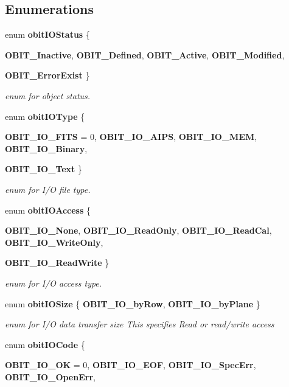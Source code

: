 \subsection*{Enumerations}
\begin{CompactItemize}
\item 
enum {\bf obit\-IOStatus} \{ \par
{\bf OBIT\_\-Inactive}, 
{\bf OBIT\_\-Defined}, 
{\bf OBIT\_\-Active}, 
{\bf OBIT\_\-Modified}, 
\par
{\bf OBIT\_\-Error\-Exist}
 \}
\begin{CompactList}\small\item\em enum for object status. \item\end{CompactList}\item 
enum {\bf obit\-IOType} \{ \par
{\bf OBIT\_\-IO\_\-FITS} = 0, 
{\bf OBIT\_\-IO\_\-AIPS}, 
{\bf OBIT\_\-IO\_\-MEM}, 
{\bf OBIT\_\-IO\_\-Binary}, 
\par
{\bf OBIT\_\-IO\_\-Text}
 \}
\begin{CompactList}\small\item\em enum for I/O file type. \item\end{CompactList}\item 
enum {\bf obit\-IOAccess} \{ \par
{\bf OBIT\_\-IO\_\-None}, 
{\bf OBIT\_\-IO\_\-Read\-Only}, 
{\bf OBIT\_\-IO\_\-Read\-Cal}, 
{\bf OBIT\_\-IO\_\-Write\-Only}, 
\par
{\bf OBIT\_\-IO\_\-Read\-Write}
 \}
\begin{CompactList}\small\item\em enum for I/O access type. \item\end{CompactList}\item 
enum {\bf obit\-IOSize} \{ {\bf OBIT\_\-IO\_\-by\-Row}, 
{\bf OBIT\_\-IO\_\-by\-Plane}
 \}
\begin{CompactList}\small\item\em enum for I/O data transfer size This specifies Read or read/write access \item\end{CompactList}\item 
enum {\bf obit\-IOCode} \{ \par
{\bf OBIT\_\-IO\_\-OK} = 0, 
{\bf OBIT\_\-IO\_\-EOF}, 
{\bf OBIT\_\-IO\_\-Spec\-Err}, 
{\bf OBIT\_\-IO\_\-Open\-Err}, 
\par

\end{CompactItemize}
